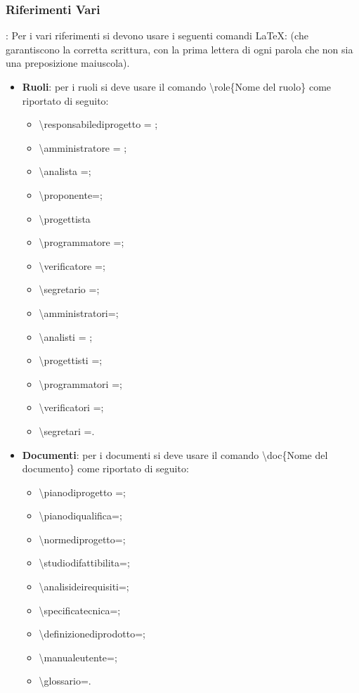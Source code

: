 \documentclass[../NormeDiProgetto.tex]{subfiles}
\begin{document}
			\subsubsection{Riferimenti Vari}: Per i vari riferimenti si devono usare i seguenti comandi \LaTeX: (che garantiscono la corretta scrittura, con la prima lettera di ogni parola che non sia una preposizione maiuscola).
			\begin{itemize}
				\item \textbf{Ruoli}: per i ruoli si deve usare il comando \textbackslash role\{Nome del ruolo\} come riportato di seguito:
					\begin{itemize}
					 	\item \textbackslash responsabilediprogetto = \responsabilediprogetto ; 
					 	\item \textbackslash amministratore = \amministratore ;
					 	\item \textbackslash analista =\analista ;
					 	\item \textbackslash proponente=\analista ;
					 	\item \textbackslash progettista
					 	\item \textbackslash programmatore =\programmatore ;
					 	\item \textbackslash verificatore =\verificatore ;
					 	\item \textbackslash segretario =\segretario ;
					 	\item \textbackslash amministratori=\amministratori ;
					 	\item \textbackslash analisti = \analisti ;
					 	\item \textbackslash progettisti =\progettisti ;
					 	\item \textbackslash programmatori =\programmatori ;
					 	\item \textbackslash verificatori =\verificatori ;
					 	\item \textbackslash segretari =\segretari .
					\end{itemize}	
				\item \textbf{Documenti}: per i documenti si deve usare il comando \textbackslash doc\{Nome del documento\} come riportato di seguito:
					\begin{itemize}
						\item \textbackslash pianodiprogetto =\pianodiprogetto ;
						\item \textbackslash pianodiqualifica=\pianodiqualifica ;
						\item \textbackslash normediprogetto=\normediprogetto ;
						\item \textbackslash studiodifattibilita=\studiodifattibilita ;
						\item \textbackslash analisideirequisiti=\analisideirequisiti ;
						\item \textbackslash specificatecnica=\specificatecnica ;
						\item \textbackslash definizionediprodotto= ;
						\item \textbackslash manualeutente=\manualeutente ;
						\item \textbackslash glossario=\glossario .
								

\end{itemize}
\end{itemize}
\end{document}
